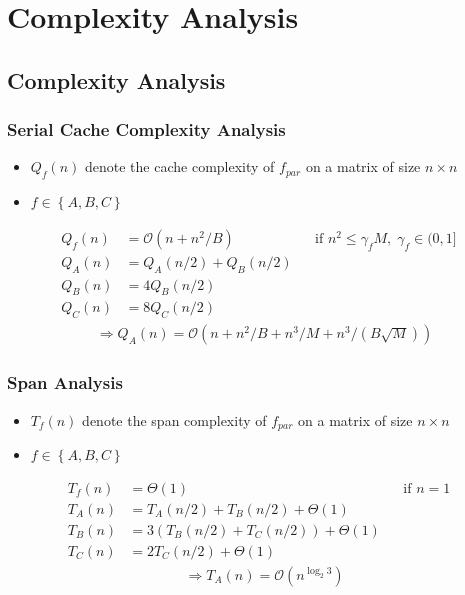 \section{Complexity Analysis}

\subsection{Complexity Analysis}
\begin{frame}
    \frametitle{Serial Cache Complexity Analysis}
    \begin{itemize}
    	\item $Q_f(n)$ denote the cache complexity of $f_{par}$ on a matrix of size $n \times n$
    	\item $f \in \left\{ A, B, C \right\}$
    \end{itemize}
    \begin{align*}
		Q_f(n) &= \mathcal{O}(n + n^2 / B) 
			&& \text{if } n^2 \le \gamma_f M, \; \gamma_f \in (0, 1 ] \\
		Q_A(n) &= Q_A(n/2) + Q_B(n/2) \\
		Q_B(n) &= 4 Q_B(n/2) \\
		Q_C(n) &= 8 Q_C(n/2)
    \end{align*}
    \begin{align*}
    	&\Rightarrow Q_A(n) = \mathcal{O}\left(n + n^2/B + n^3 /M + n^3 / \left(B \sqrt{M}\right)  \right)
  	\end{align*}
\end{frame}

\begin{frame}
    \frametitle{Span Analysis}
    \begin{itemize}
    	\item $T_f(n)$ denote the span complexity of $f_{par}$ on a matrix of size $n \times n$
    	\item $f \in \left\{ A, B, C \right\}$
    \end{itemize}
    \begin{align*}
		T_f(n) &= \Theta(1)
			&& \text{if } n = 1 \\
		T_A(n) &= T_A(n/2) + T_B(n/2) + \Theta(1) \\
		T_B(n) &= 3 (T_B(n/2) + T_C(n/2)) + \Theta(1) \\
		T_C(n) &= 2 T_C(n/2) + \Theta(1)
    \end{align*}
    \begin{align*}
    	& \Rightarrow T_A(n) = \mathcal{O}\left(n^{\log_2 3}\right)
  	\end{align*}
\end{frame}

